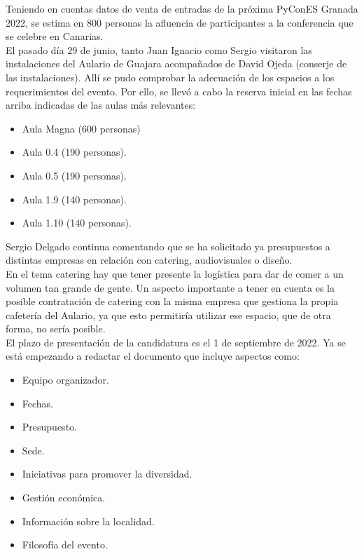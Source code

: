 \documentclass[a4paper,12pt]{article}
\begin{document}
Teniendo en cuentas datos de venta de entradas de la próxima PyConES Granada 2022, se estima en 800 personas la afluencia de participantes a la conferencia que se celebre en Canarias.\\

El pasado día 29 de junio, tanto Juan Ignacio como Sergio visitaron las instalaciones del Aulario de Guajara acompañados de David Ojeda (conserje de las instalaciones). Allí se pudo comprobar la adecuación de los espacios a los requerimientos del evento. Por ello, se llevó a cabo la reserva inicial en las fechas arriba indicadas de las aulas más relevantes:

\begin{itemize}
    \item Aula Magna (600 personas)
    \item Aula 0.4 (190 personas).
    \item Aula 0.5 (190 personas).
    \item Aula 1.9 (140 personas).
    \item Aula 1.10 (140 personas).
\end{itemize}

Sergio Delgado continua comentando que se ha solicitado ya presupuestos a distintas empresas en relación con catering, audiovisuales o diseño.\\

En el tema catering hay que tener presente la logística para dar de comer a un volumen tan grande de gente. Un aspecto importante a tener en cuenta es la posible contratación de catering con la misma empresa que gestiona la propia cafetería del Aulario, ya que esto permitiría utilizar ese espacio, que de otra forma, no sería posible.\\

El plazo de presentación de la candidatura es el 1 de septiembre de 2022. Ya se está empezando a redactar el documento que incluye aspectos como:

\begin{itemize}
    \item Equipo organizador.
    \item Fechas.
    \item Presupuesto.
    \item Sede.
    \item Iniciativas para promover la diversidad.
    \item Gestión económica.
    \item Información sobre la localidad.
    \item Filosofía del evento.
\end{itemize}
\end{document}
